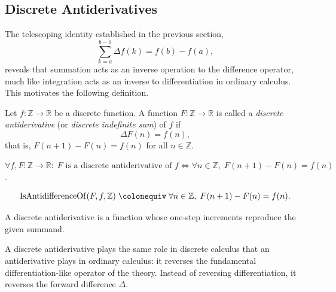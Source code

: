 
\subsection{Discrete Antiderivatives}
\label{sec:discrete-antiderivative}

\begin{exposition}
The telescoping identity established in the previous section,
\[
\sum_{k=a}^{b-1} \Delta f(k) = f(b) - f(a),
\]
reveals that summation acts as an inverse operation to the difference
operator, much like integration acts as an inverse to differentiation
in ordinary calculus. This motivates the following definition.
\end{exposition}

\begin{definition}
\label{def:discrete-antiderivative}
Let \(f : \mathbb{Z} \to \mathbb{R}\) be a discrete function.
A function \(F : \mathbb{Z} \to \mathbb{R}\) is called a
\emph{discrete antiderivative} (or \emph{discrete indefinite sum}) of \(f\) if
\[
\Delta F(n) = f(n),
\]
that is, \(F(n+1) - F(n) = f(n)\) for all \(n \in \mathbb{Z}\).
\end{definition}

\begin{remark*}
\(\forall f,F : \mathbb{Z}\to\mathbb{R}:\;
F \text{ is a discrete antiderivative of } f
\iff
\forall n \in \mathbb{Z},\; F(n+1) - F(n) = f(n)\).
\end{remark*}

\begin{remark*}
\[
  \operatorname{IsAntidifferenceOf}(F,f,\mathbb Z)
  \;\colonequiv\;
  \forall n\in\mathbb Z,\; F(n+1)-F(n)=f(n).
\]
\end{remark*}

\begin{remark*}[Interpretation]
A discrete antiderivative is a function whose one-step increments reproduce
the given summand.


A discrete antiderivative plays the same role in discrete calculus that an
antiderivative plays in ordinary calculus: it reverses the fundamental
differentiation-like operator of the theory. Instead of reversing
differentiation, it reverses the forward difference \(\Delta\).
\end{remark*}

